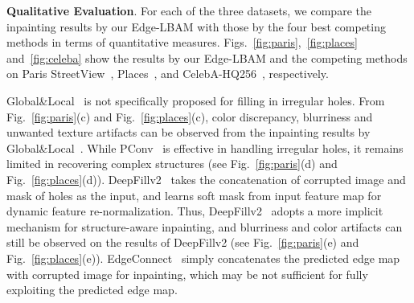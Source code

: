 \documentclass[10pt,journal,compsoc]{IEEEtran}
\newcommand{\ie}{\textit{i}.\textit{e}.}
\begin{document}
%

{\textbf{Qualitative Evaluation}.} For each of the three datasets, we compare the inpainting results by our Edge-LBAM with those by the four best competing methods in terms of quantitative measures.
%
Figs.~\ref{fig:paris},~\ref{fig:places} and~\ref{fig:celeba} show the results by our Edge-LBAM and the competing methods on Paris StreetView~\cite{doersch2015makes}, Places~\cite{zhou2017places}, and CelebA-HQ256~\cite{karras2017progressive}, respectively.



Global\&Local~\cite{IizukaGL} is not specifically proposed for filling in irregular holes.
%
From Fig.~\ref{fig:paris}(c) and Fig.~\ref{fig:places}(c), color discrepancy, blurriness and unwanted texture artifacts can be observed from the inpainting results by Global\&Local~\cite{IizukaGL}.
%
While PConv~\cite{partialconv2017} is effective in handling irregular holes, it remains limited in recovering complex structures (see Fig.~\ref{fig:paris}(d) and Fig.~\ref{fig:places}(d)).
%
%
%
%
%
DeepFillv2~\cite{yu2018free} takes the concatenation of corrupted image and mask of holes as the input, and learns soft mask from input feature map for dynamic feature re-normalization.
%
Thus, DeepFillv2~\cite{yu2018free} adopts a more implicit mechanism for structure-aware inpainting, and blurriness and color artifacts can still be observed on the results of DeepFillv2 (see Fig.~\ref{fig:paris}(e) and Fig.~\ref{fig:places}(e)).
%
EdgeConnect~\cite{nazeri2019edgeconnect} simply concatenates the predicted edge map with corrupted image for inpainting, which may be not sufficient for fully exploiting the predicted edge map.
%	
\end{document}
